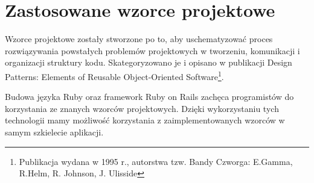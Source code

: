 \section{Zastosowane wzorce projektowe}
\label{sec:patterns}
Wzorce projektowe zostały stworzone po to, aby uschematyzować proces rozwiązywania powstałych problemów projektowych w tworzeniu, komunikacji i organizacji struktury kodu. Skategoryzowano je i opisano w publikacji Design Patterns: Elements of Reusable Object-Oriented Software\footnote{Publikacja wydana w 1995 r., autorstwa tzw. Bandy Czworga: E.Gamma, R.Helm, R. Johnson, J. Ulisside}.

Budowa języka Ruby oraz framework Ruby on Rails zachęca programistów do korzystania ze znanych wzorców projektowych. Dzięki wykorzystaniu tych technologii mamy możliwość korzystania z zaimplementowanych wzorców w samym szkielecie aplikacji.
